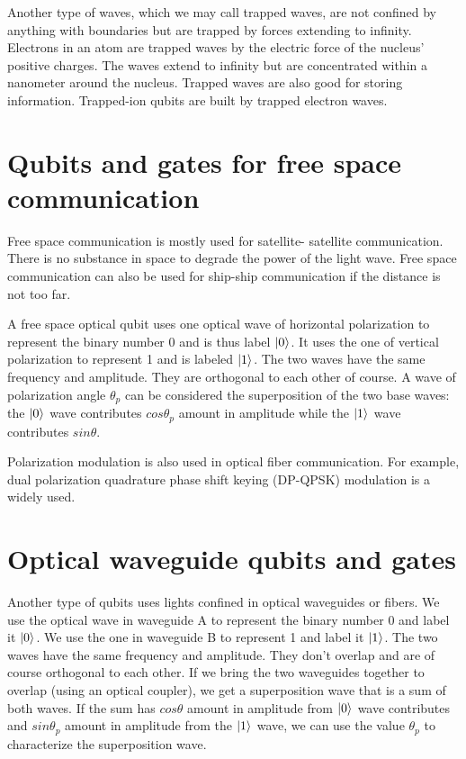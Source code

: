 \documentclass[Letter,11pt]{book}
\begin{document}
Another type of waves, which we may call trapped waves, are not confined by anything with boundaries but are trapped by forces extending to infinity. Electrons in an atom are trapped waves by the electric force of the nucleus' positive charges. The waves extend to infinity but are concentrated within a nanometer around the nucleus. Trapped waves are also good for storing information. Trapped-ion qubits are built by trapped electron waves.

\section{Qubits and gates for free space communication}
Free space communication is mostly used for satellite- satellite communication. There is no substance in space to degrade the power of the light wave. Free space communication can also be used for ship-ship communication if the distance is not too far.

A free space optical qubit uses one optical wave of horizontal polarization to represent the binary number 0 and is thus label $\vert {0} \rangle_{}$. It uses the one of vertical polarization to represent 1 and is labeled $\vert {1} \rangle_{}$. The two waves have the same frequency and amplitude. They are orthogonal to each other of course. A wave of polarization angle $\theta_p$ can be considered the superposition of the two base waves: the $\vert {0} \rangle_{}$ wave contributes $cos\theta_p$ amount in amplitude while the $\vert {1} \rangle_{}$ wave contributes $sin\theta$.

Polarization modulation is also used in optical fiber communication. For example, dual polarization quadrature phase shift keying (DP-QPSK) modulation is a widely used.

\section{Optical waveguide qubits and gates}
Another type of qubits uses lights confined in optical waveguides or fibers. We use the optical wave in waveguide A to represent the binary number 0 and label it $\vert {0} \rangle_{}$. We use the one in waveguide B to represent 1 and label it $\vert {1} \rangle_{}$. The two waves have the same frequency and amplitude. They don't overlap and are of course orthogonal to each other. If we bring the two waveguides together to overlap (using an optical coupler), we get a superposition wave that is a sum of both waves. If the sum has $cos\theta$ amount in amplitude from $\vert {0} \rangle_{}$ wave contributes and $sin\theta_p$ amount in amplitude from the $\vert {1} \rangle_{}$ wave, we can use the value $\theta_p$ to characterize the superposition wave.
\end{document}
